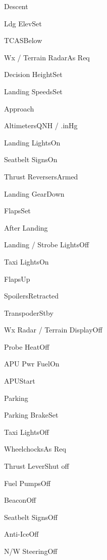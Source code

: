 \documentclass[sim-use, halfpage]{checklist}
\begin{document}
\begin{checklist}{Descent}
    \item{Ldg Elev}{Set}
    \item{TCAS}{Below}
    \item{Wx / Terrain Radar}{As Req}
    \item{Decision Height}{Set}
    \item{Landing Speeds}{Set}
\end{checklist}

\begin{checklist}{Approach}
    \item{Altimeters}{\blank QNH / \blank.\blank inHg}
    \item{Landing Lights}{On}
    \item{Seatbelt Signs}{On}
    \item{Thrust Reversers}{Armed}
    \item{Landing Gear}{Down}
    \item{Flaps}{Set}
\end{checklist}

\begin{checklist}{After Landing}
    \item{Landing / Strobe Lights}{Off}
    \item{Taxi Lights}{On}
    \item{Flaps}{Up}
    \item{Spoilers}{Retracted}
    \item{Transpoder}{Stby}
    \item{Wx Radar / Terrain Display}{Off}
    \item{Probe Heat}{Off}
    \item{APU Pwr Fuel}{On}
    \item{APU}{Start}
\end{checklist}

\begin{checklist}{Parking}
    \item{Parking Brake}{Set}
    \item{Taxi Lights}{Off}
    \item{Wheelchocks}{As Req}
    \item{Thrust Lever}{Shut off}
    \item{Fuel Pumps}{Off}
    \item{Beacon}{Off}
    \item{Seatbelt Signs}{Off}
    \item{Anti-Ice}{Off}
    \item{N/W Steering}{Off}
\end{checklist}
\end{document}
